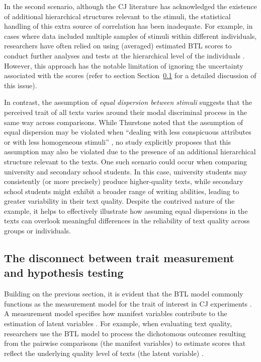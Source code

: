 \documentclass[
  authoryear,
  preprint,
  1p]{elsarticle}
\begin{document}
In the second scenario, although the CJ literature has acknowledged the
existence of additional hierarchical structures relevant to the stimuli,
the statistical handling of this extra source of correlation has been
inadequate. For example, in cases where data included multiple samples
of stimuli within different individuals, researchers have often relied
on using (averaged) estimated BTL scores to conduct further analyses and
tests at the hierarchical level of the individuals
\citep{Bramley_et_al_2019, Boonen_et_al_2020, Bouwer_et_al_2023, vanDaal_et_al_2017, Jones_et_al_2019, Gijsen_et_al_2021}.
However, this approach has the notable limitation of ignoring the
uncertainty associated with the scores (refer to section
Section~\ref{sec-theory-issue2} for a detailed discussion of this
issue).

In contrast, the assumption of \emph{equal dispersion between stimuli}
suggests that the perceived trait of all texts varies around their modal
discriminal process in the same way across comparisons. While Thurstone
noted that the assumption of equal dispersion may be violated when
``dealing with less conspicuous attributes or with less homogeneous
stimuli'' \citep[pp.~374]{Thurstone_1927a}, no study explicitly proposes
that this assumption may also be violated due to the presence of an
additional hierarchical structure relevant to the texts. One such
scenario could occur when comparing university and secondary school
students. In this case, university students may consistently (or more
precisely) produce higher-quality texts, while secondary school students
might exhibit a broader range of writing abilities, leading to greater
variability in their text quality. Despite the contrived nature of the
example, it helps to effectively illustrate how assuming equal
dispersions in the texts can overlook meaningful differences in the
reliability of text quality across groups or individuals.

\subsection{The disconnect between trait measurement and hypothesis
testing}\label{sec-theory-issue2}

Building on the previous section, it is evident that the BTL model
commonly functions as the measurement model for the trait of interest in
CJ experiments \citep{Andrich_1978, Bramley_2008}. A measurement model
specifies how manifest variables contribute to the estimation of latent
variables \citep{Everitt_et_al_2010}. For example, when evaluating text
quality, researchers use the BTL model to process the dichotomous
outcomes resulting from the pairwise comparisons (the manifest
variables) to estimate scores that reflect the underlying quality level
of texts (the latent variable)
\citep{Laming_2004, Pollitt_2012b, Whitehouse_2012, vanDaal_et_al_2016, Lesterhuis_2018_thesis, Coertjens_et_al_2017, Goossens_et_al_2018, Bouwer_et_al_2023}.
\end{document}
